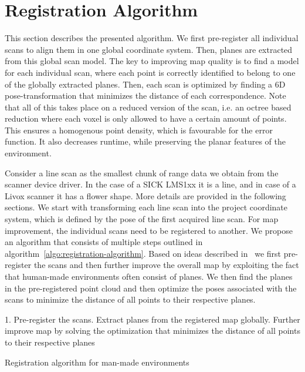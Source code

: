 \section{Registration Algorithm}

This section describes the presented algorithm.
We first pre-register all individual scans to align them in one global coordinate system.
Then, planes are extracted from this global scan model.
The key to improving map quality is to find a model for each individual scan, where each point is correctly identified to belong to one of the globally extracted planes.
Then, each scan is optimized by finding a 6D pose-transformation that minimizes the distance of each correspondence.
Note that all of this takes place on a reduced version of the scan, i.e. an octree based reduction where each voxel is only allowed to have a certain amount of points.
This ensures a homogenous point density, which is favourable for the error function.
It also decreases runtime, while preserving the planar features of the environment. 
 
Consider a line scan as the smallest chunk of range data we obtain from the scanner device driver.
In the case of a SICK LMS1xx it is a line, and in case of a Livox scanner it has a flower shape.
More details are provided in the following sections.
We start with transforming each line scan into the project coordinate system, which is defined by the pose of the first acquired line scan.
%
For map improvement, the individual scans need to be registered to another. 
We propose an algorithm that consists of multiple steps outlined in algorithm~\ref{algo:registration-algorithm}. 
Based on ideas described in~\cite{Borrmann2010} we first pre-register the scans and then further improve the overall map by exploiting the fact that human-made environments often consist of planes. 
We then find the planes in the pre-registered point cloud and then optimize the poses associated with the scans to minimize the distance of all points to their respective planes. 

\begin{algorithm}
    \SetAlgoLined
    1. Pre-register the scans. Extract planes from the registered map globally. Further improve map by solving the optimization that minimizes the distance of all points to their respective planes\;
    \caption{Registration algorithm for man-made environments}
    \label{algo:registration-algorithm}
\end{algorithm}

